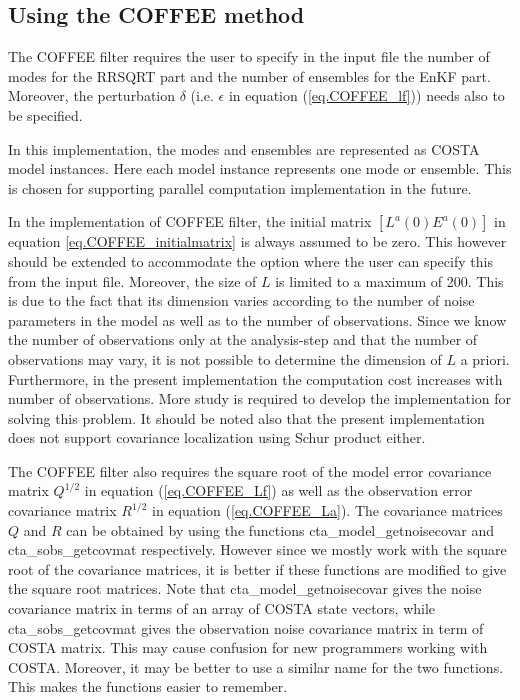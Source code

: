 \subsection{Using the COFFEE method}
The COFFEE filter requires the user to specify in the input file the number of
modes for the RRSQRT part and the number of ensembles for the EnKF part.
Moreover, the perturbation $\delta$ (i.e. $\epsilon$ in equation
(\ref{eq.COFFEE_lf})) needs also to be specified.

In this implementation, the modes and ensembles are represented as COSTA model
instances. Here each model instance represents one mode or ensemble. This is
chosen for supporting parallel computation implementation in the future.

In the implementation of COFFEE filter, the initial matrix $[L^a(0) E^a(0)]$ in
equation \ref{eq.COFFEE_initialmatrix} is always assumed to be zero. This
however should be extended to accommodate the option where the user can specify
this from the input file. Moreover, the size of $L$ is limited to a maximum of
200. This is due to the fact that its dimension varies according to the number
of noise parameters in the model as well as to the number of observations.
Since we know the number of observations only at the analysis-step and that the
number of observations may vary, it is not possible to determine the dimension
of $L$ a priori. Furthermore, in the present implementation the computation
cost increases with number of observations. More study is required to develop
the implementation for solving this problem. It should be noted also that the
present implementation does not support covariance localization using Schur
product either.

The COFFEE filter also requires the square root of the model error covariance
matrix $Q^{1/2}$ in equation (\ref{eq.COFFEE_Lf}) as well as the observation
error covariance matrix $R^{1/2}$ in equation (\ref{eq.COFFEE_La}). The
covariance matrices $Q$ and $R$ can be obtained by using the functions
cta\_model\_getnoisecovar and cta\_sobs\_getcovmat respectively. However since
we mostly work with the square root of the covariance matrices, it is better if
these functions are modified to give the square root matrices. Note that
cta\_model\_getnoisecovar gives the noise covariance matrix in terms of an
array of COSTA state vectors, while cta\_sobs\_getcovmat gives the observation
noise covariance matrix in term of COSTA matrix. This may cause confusion for
new programmers working with COSTA. Moreover, it may be better to use a similar
name for the two functions. This makes the functions easier to remember.

